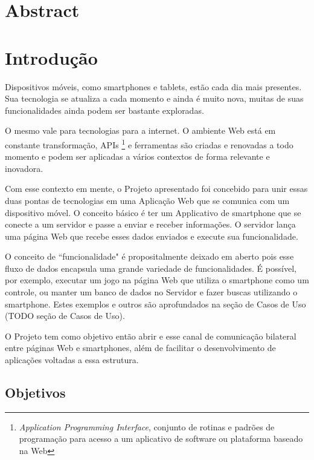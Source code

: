 \documentclass[a4paper,12pt]{article}
\begin{document}
\newpage
\section{Abstract}


\newpage
\section{Introdução}
Dispositivos móveis, como smartphones e tablets, estão cada dia mais presentes. Sua tecnologia se atualiza a cada momento e ainda é muito nova, muitas de suas funcionalidades ainda podem ser bastante exploradas.

O mesmo vale para tecnologias para a internet. O ambiente Web está em constante transformação, APIs \footnote{\emph{Application Programming Interface}, conjunto de rotinas e padrões de programação para acesso a um aplicativo de software ou plataforma baseado na Web} e ferramentas são criadas e renovadas a todo momento e podem ser aplicadas a vários contextos de forma relevante e inovadora.

Com esse contexto em mente, o Projeto apresentado foi concebido para unir essas duas pontas de tecnologias em uma Aplicação Web que se comunica com um dispositivo móvel. O conceito básico é ter um Applicativo de smartphone que se conecte a um servidor e passe a enviar e receber informações. O servidor lança uma página Web que recebe esses dados enviados e execute sua funcionalidade.

O conceito de “funcionalidade" é propositalmente deixado em aberto pois esse fluxo de dados encapsula uma grande variedade de funcionalidades. É possível, por exemplo, executar um jogo na página Web que utiliza o smartphone como um controle, ou manter um banco de dados no Servidor e fazer buscas utilizando o smartphone. Estes exemplos e outros são aprofundados na seção de Casos de Uso (TODO seção de Casos de Uso).

O Projeto tem como objetivo então abrir e esse canal de comunicação bilateral entre páginas Web e smartphones, além de facilitar o desenvolvimento de aplicações voltadas a essa estrutura.




\newpage
\subsection{Objetivos}
\end{document}
